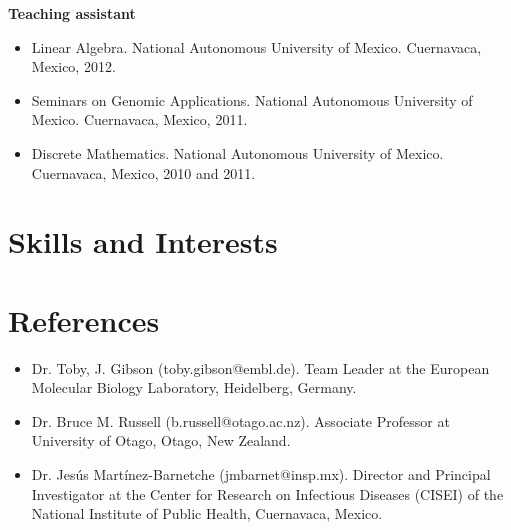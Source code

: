 \documentclass[11pt,a4paper,sans]{moderncv} %
\begin{document}
\vspace{.1cm}
\textbf{Teaching assistant}
\begin{itemize}
  \item Linear Algebra. National Autonomous University of Mexico. Cuernavaca, Mexico, 2012.
  \item Seminars on Genomic Applications. National Autonomous University of Mexico. Cuernavaca, Mexico, 2011.
  \item Discrete Mathematics. National Autonomous University of Mexico. Cuernavaca, Mexico, 2010 and 2011.
\end{itemize}

\vspace{0.5cm}

\section{Skills and Interests}

\vspace{0.5cm}

\section{References}
\begin{itemize}
  \item Dr. Toby, J. Gibson (toby.gibson@embl.de).
  Team Leader at the European Molecular Biology Laboratory, Heidelberg, Germany.
  \item Dr. Bruce M. Russell (b.russell@otago.ac.nz).
  Associate Professor at University of Otago, Otago, New Zealand.
  \item Dr. Jes\'us Mart\'inez-Barnetche (jmbarnet@insp.mx).
  Director and Principal Investigator at the Center for Research on Infectious Diseases (CISEI) of the National Institute of Public Health, Cuernavaca, Mexico.
\end{itemize}
\end{document}
